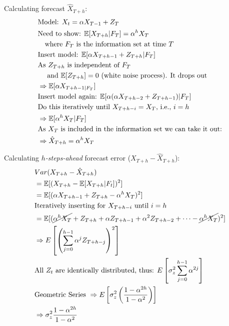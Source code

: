 \begin{footnotesize}
Calculating forecast $\hat{X}_{T+h}$:
\begin{align*}
   &\text{Model: } X_t = \alpha X_{T-1} + Z_T \\
   &\text{Need to show: } \mathbb{E}[X_{T+h}|F_T] = \alpha^h X_T \\
   &\text{\quad where $F_T$ is the information set at time $T$} \\
   &\text{Insert model: } \mathbb{E}[\alpha X_{T+h-1} + Z_{T+h}|F_T] \\
   &\text{As $Z_{T+h}$ is independent of $F_T$} \\
   &\text{ \quad and $\mathbb{E}[Z_{T+h}]=0$ (white noise process). It drops out} \\
   &\Rightarrow \mathbb{E}[\alpha X_{T+h-1|F_T}] \\
   &\text{Insert model again: } \mathbb{E}[\alpha(\alpha X_{T+h-2} + Z_{T+h-1}) |F_T] \\
   &\text{Do this iteratively until $X_{T+h-i} = X_T$, i.e., $i=h$} \\
   &\Rightarrow \mathbb{E}[\alpha^h X_T|F_T] \\
   &\text{As $X_T$ is included in the information set we can take it out:}\\
   &\Rightarrow \hat{X}_{T+h}= \alpha^h X_T
\end{align*}

Calculating \textit{$h$-steps-ahead} forecast error ($X_{T+h}-\hat{X}_{T+h}$):
\begin{align*}
    & Var(X_{T+h}-\hat{X}_{T+h}) \\
    &= \mathbb{E}[(X_{T+h} - \mathbb{E}[X_{T+h}|F_t])^2 ] \\
    &= \mathbb{E}[(\alpha X_{T+h-1} +Z_{T+h} - \alpha^h X_T)^2 ] \\
    &\text{Iteratively inserting for $X_{T+h-i}$ until $i=h$ }\\
    &= \mathbb{E}[(\cancel{\alpha^h X_T} + Z_{T+h} +\alpha Z_{T+h-1} + \alpha^2 Z_{T+h-2} +\cdots - \cancel{\alpha^h X_T} )^2 ]\\
    &\Rightarrow E\left[\left(\sum_{j=0}^{h-1} \alpha^j Z_{T+h-j} \right)^2 \right] \\
    &\text{All $Z_t$ are identically distributed, thus: } E \left[ \sigma_z^2 \sum_{j=0}^{h-1} \alpha^{2j}  \right] \\
    &\text{Geometric Series } \Rightarrow E \left[ \sigma_z^2 \left( \frac{1-\alpha^{2h}}{1-\alpha^2} \right) \right] \\
    & \Rightarrow \sigma_z^2 \frac{1-\alpha^{2h}}{1-\alpha^2}
\end{align*}
\end{footnotesize}
